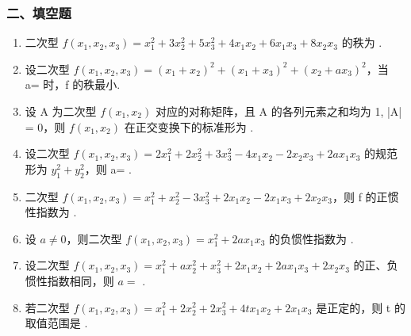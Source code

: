 \documentclass[12pt, a4paper]{ctexart}
\begin{document}
\subsubsection*{二、填空题}

\begin{enumerate}[start=14]
    \item 二次型 $ f(x_{1},x_{2},x_{3})=x_{1}^{2}+3x_{2}^{2}+5x_{3}^{2}+4x_{1}x_{2}+6x_{1}x_{3}+8x_{2}x_{3} $ 的秩为 \underline{\hspace{2cm}}.

    \item 设二次型 $ f(x_{1},x_{2},x_{3})=\left(x_{1}+x_{2}\right)^{2}+\left(x_{1}+x_{3}\right)^{2}+\left(x_{2}+ax_{3}\right)^{2} $，当 a=\underline{\hspace{2cm}} 时，f 的秩最小.

    \item 设 A 为二次型 $ f(x_{1}, x_{2}) $ 对应的对称矩阵，且 A 的各列元素之和均为 1, |A| = 0，则 $ f(x_{1}, x_{2}) $ 在正交变换下的标准形为 \underline{\hspace{2cm}}.

    \item 设二次型 $ f(x_{1},x_{2},x_{3})=2x_{1}^{2}+2x_{2}^{2}+3x_{3}^{2}-4x_{1}x_{2}-2x_{2}x_{3}+2ax_{1}x_{3} $ 的规范形为 $ y_{1}^{2}+y_{2}^{2} $，则 a= \underline{\hspace{2cm}}.

    \item 二次型 $ f(x_{1},x_{2},x_{3})=x_{1}^{2}+x_{2}^{2}-3x_{3}^{2}+2x_{1}x_{2}-2x_{1}x_{3}+2x_{2}x_{3} $，则 f 的正惯性指数为 \underline{\hspace{2cm}}.

    \item 设 $ a \neq 0 $，则二次型 $ f(x_{1}, x_{2}, x_{3}) = x_{1}^{2} + 2ax_{1}x_{3} $ 的负惯性指数为 \underline{\hspace{2cm}}.

    \item 设二次型 $ f(x_{1},x_{2},x_{3})=x_{1}^{2}+ax_{2}^{2}+x_{3}^{2}+2x_{1}x_{2}+2ax_{1}x_{3}+2x_{2}x_{3} $ 的正、负惯性指数相同，则 $ a= $ \underline{\hspace{2cm}}.

    \item 若二次型 $ f(x_{1},x_{2},x_{3})=x_{1}^{2}+2x_{2}^{2}+2x_{3}^{2}+4tx_{1}x_{2}+2x_{1}x_{3} $ 是正定的，则 t 的取值范围是 \underline{\hspace{2cm}}.
\end{enumerate}
\end{document}
